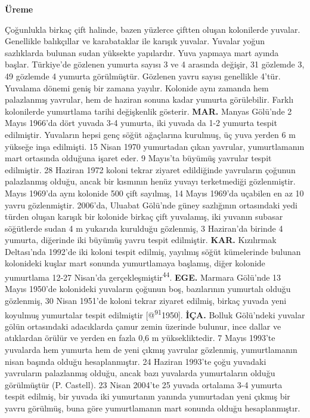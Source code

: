 \documentclass[
  letterpaper,
  DIV=11,
  numbers=noendperiod]{scrreprt}
\begin{document}
\textbf{Üreme}

Çoğunlukla birkaç çift halinde, bazen yüzlerce çiftten oluşan
kolonilerde yuvalar. Genellikle balıkçıllar ve karabataklar ile karışık
yuvalar. Yuvalar yoğun sazlıklarda bulunan sudan yüksekte yapılardır.
Yuva yapmaya mart ayında başlar. Türkiye'de gözlenen yumurta sayısı 3 ve
4 arasında değişir, 31 gözlemde 3, 49 gözlemde 4 yumurta görülmüştür.
Gözlenen yavru sayısı genellikle 4'tür. Yuvalama dönemi geniş bir zamana
yayılır. Kolonide aynı zamanda hem palazlanmış yavrular, hem de haziran
sonuna kadar yumurta görülebilir. Farklı kolonilerde yumurtlama tarihi
değişkenlik gösterir. \textbf{MAR.} Manyas Gölü'nde 2 Mayıs 1966'da dört
yuvada 3-4 yumurta, iki yuvada da 1-2 yumurta tespit edilmiştir.
Yuvaların hepsi genç söğüt ağaçlarına kurulmuş, üç yuva yerden 6 m
yükseğe inşa edilmişti. 15 Nisan 1970 yumurtadan çıkan yavrular,
yumurtlamanın mart ortasında olduğuna işaret eder. 9 Mayıs'ta büyümüş
yavrular tespit edilmiştir. 28 Haziran 1972 koloni tekrar ziyaret
edildiğinde yavruların çoğunun palazlanmış olduğu, ancak bir kısmının
henüz yuvayı terketmediği gözlenmiştir. Mayıs 1969'da aynı kolonide 500
çift sayılmış, 14 Mayıs 1969'da uçabilen en az 10 yavru gözlenmiştir.
2006'da, Uluabat Gölü'nde güney sazlığının ortasındaki yedi türden
oluşan karışık bir kolonide birkaç çift yuvalamış, iki yuvanın subasar
söğütlerde sudan 4 m yukarıda kurulduğu gözlenmiş, 3 Haziran'da birinde
4 yumurta, diğerinde iki büyümüş yavru tespit edilmiştir. \textbf{KAR.}
Kızılırmak Deltası'nda 1992'de iki koloni tespit edilmiş, yayılmış söğüt
kümelerinde bulunan kolonideki kuşlar mart sonunda yumurtlamaya
başlamış, diğer kolonide yumurtlama 12-27 Nisan'da
gerçekleşmiştir\textsuperscript{44}. \textbf{EGE.} Marmara Gölü'nde 13
Mayıs 1950'de kolonideki yuvaların çoğunun boş, bazılarının yumurtalı
olduğu gözlenmiş, 30 Nisan 1951'de koloni tekrar ziyaret edilmiş, birkaç
yuvada yeni koyulmuş yumurtalar tespit edilmiştir
{[}@\textsuperscript{91}1950{]}. \textbf{İÇA.} Bolluk Gölü'ndeki yuvalar
gölün ortasındaki adacıklarda çamur zemin üzerinde bulunur, ince dallar
ve atıklardan örülür ve yerden en fazla 0,6 m yüksekliktedir. 7 Mayıs
1993'te yuvalarda hem yumurta hem de yeni çıkmış yavrular gözlenmiş,
yumurtlamanın nisan başında olduğu hesaplanmıştır. 24 Haziran 1993'te
çoğu yuvadaki yavruların palazlanmış olduğu, ancak bazı yuvalarda
yumurtaların olduğu görülmüştür (P. Castell). 23 Nisan 2004'te 25 yuvada
ortalama 3-4 yumurta tespit edilmiş, bir yuvada iki yumurtanın yanında
yumurtadan yeni çıkmış bir yavru görülmüş, buna göre yumurtlamanın mart
sonunda olduğu hesaplanmıştır.
\end{document}
